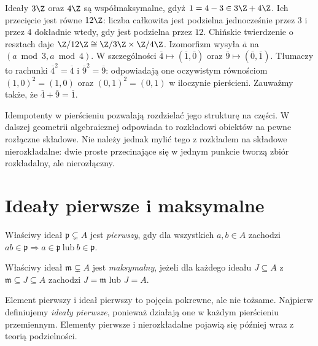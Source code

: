 \begin{przyklad}[Rozkład $\Z/12\Z$]
Ideały $3\Z$ oraz $4\Z$ są współmaksymalne, gdyż
$1=4-3\in3\Z+4\Z$. Ich przecięcie jest równe $12\Z$:
liczba całkowita jest podzielna jednocześnie przez $3$ i przez $4$
dokładnie wtedy, gdy jest podzielna przez $12$.
Chińskie twierdzenie o resztach daje
$\Z/12\Z\cong\Z/3\Z\times\Z/4\Z$.
Izomorfizm wysyła $\overline a$ na
$(a\bmod 3,a\bmod 4)$.
W szczególności $\overline4\mapsto(\overline1,\overline0)$
oraz $\overline9\mapsto(\overline0,\overline1)$.
Tłumaczy to rachunki $\overline4^2=\overline4$ i
$\overline9^2=\overline9$: odpowiadają one oczywistym równościom
$(1,0)^2=(1,0)$ oraz $(0,1)^2=(0,1)$ w iloczynie pierścieni.
Zauważmy także, że $\overline4+\overline9=\overline1$.
\end{przyklad}

\begin{uwaga}
Idempotenty w pierścieniu pozwalają rozdzielać jego strukturę na
części. W dalszej geometrii algebraicznej odpowiada to rozkładowi
obiektów na pewne rozłączne składowe. Nie należy jednak mylić tego
z rozkładem na składowe nierozkładalne: dwie proste przecinające się
w jednym punkcie tworzą zbiór rozkładalny, ale nierozłączny.
\end{uwaga}

\section{Ideały pierwsze i maksymalne}

\begin{definicja}
Właściwy ideał $\mathfrak p\subsetneq A$ jest \emph{pierwszy}, gdy
dla wszystkich $a,b\in A$ zachodzi
$ab\in\mathfrak p\Rightarrow a\in\mathfrak p\ \text{lub}\ b\in\mathfrak p$.
\end{definicja}

\begin{definicja}
Właściwy ideał $\mathfrak m\subsetneq A$ jest \emph{maksymalny},
jeżeli dla każdego ideału $J\subseteq A$ z
$\mathfrak m\subseteq J\subseteq A$ zachodzi
$J=\mathfrak m$ lub $J=A$.
\end{definicja}

\begin{uwaga}
Element pierwszy i ideał pierwszy to pojęcia pokrewne, ale nie tożsame.
Najpierw definiujemy \emph{ideały pierwsze}, ponieważ działają one
w każdym pierścieniu przemiennym. Elementy pierwsze i nierozkładalne
pojawią się później wraz z teorią podzielności.
\end{uwaga}


